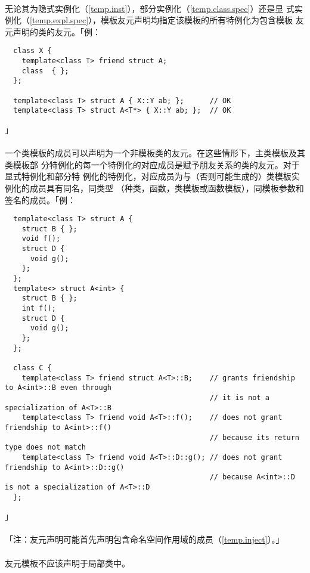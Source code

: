 \paragraph{}
无论其为隐式实例化（\ref{temp.inst}），部分实例化（\ref{temp.class.spec}）还是显
式实例化（\ref{temp.expl.spec}），模板友元声明均指定该模板的所有特例化为包含模板
友元声明的类的友元。「例：
\begin{lstlisting}
  class X {
    template<class T> friend struct A;
    class  { };
  };

  template<class T> struct A { X::Y ab; };      // OK
  template<class T> struct A<T*> { X::Y ab; };  // OK
\end{lstlisting}」

\paragraph{}
一个类模板的成员可以声明为一个非模板类的友元。在这些情形下，主类模板及其类模板部
分特例化的每一个特例化的对应成员是赋予朋友关系的类的友元。对于显式特例化和部分特
例化的特例化，对应成员为与（否则可能生成的）类模板实例化的成员具有同名，同类型
（种类，函数，类模板或函数模板），同模板参数和签名的成员。「例：
\begin{lstlisting}
  template<class T> struct A {
    struct B { };
    void f();
    struct D {
      void g();
    };
  };
  template<> struct A<int> {
    struct B { };
    int f();
    struct D {
      void g();
    };
  };

  class C {
    template<class T> friend struct A<T>::B;    // grants friendship to A<int>::B even through
                                                // it is not a specialization of A<T>::B
    template<class T> friend void A<T>::f();    // does not grant friendship to A<int>::f()
                                                // because its return type does not match
    template<class T> friend void A<T>::D::g(); // does not grant friendship to A<int>::D::g()
                                                // because A<int>::D is not a specialization of A<T>::D
  };
\end{lstlisting}」

\paragraph{}
「注：友元声明可能首先声明包含命名空间作用域的成员（\ref{temp.inject}）。」

\paragraph{}
友元模板不应该声明于局部类中。

